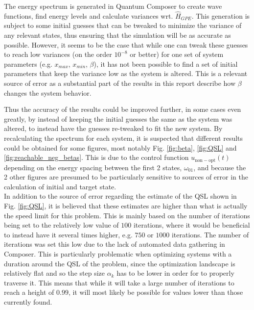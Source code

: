 \documentclass[a4paper, twocolumn]{revtex4-1}
\begin{document}
The energy spectrum is generated in Quantum Composer to create wave functions, find energy levels and calculate variances wrt. $\hat{H}_{GPE}$. This generation is subject to some initial guesses that can be tweaked to minimize the variance of any relevant states, thus ensuring that the simulation will be as accurate as possible. However, it seems to be the case that while one can tweak these guesses to reach low variances (on the order $10^{-8}$ or better) for one set of system parameters (e.g. $x_{max}$, $x_{min}$, $\beta$), it has not been possible to find a set of initial parameters that keep the variance low as the system is altered. This is a relevant source of error as a substantial part of the results in this report describe how $\beta$ changes the system behavior. 

Thus the accuracy of the results could be improved further, in some cases even greatly, by instead of keeping the initial guesses the same as the system was altered, to instead have the guesses re-tweaked to fit the new system. By recalculating the spectrum for each system, it is suspected that different results could be obtained for some figures, most notably Fig. \ref{fig:beta}, \ref{fig:QSL} and \ref{fig:reachable_neg_betas}. This is due to the control function $u_{\mathrm{non-opt}}(t)$ depending on the energy spacing between the first 2 states, $\omega_{01}$, and because the 2 other figures are presumed to be particularly sensitive to sources of error in the calculation of initial and target state.   \\

In addition to the source of error regarding the estimate of the QSL shown in Fig. \ref{fig:QSL}, it is believed that these estimates are higher than what is actually the speed limit for this problem. This is mainly based on the number of  iterations being set to the relatively low value of $100$ iterations, where it would be beneficial to instead have it several times higher, e.g. $750$ or $1000$ iterations. The number of iterations was set this low due to the lack of automated data gathering in Composer. This is particularly problematic when optimizing systems with a duration around the QSL of the problem, since the optimization landscape is relatively flat and so the step size $\alpha_k$ has to be lower in order for  to properly traverse it. This means that while it will take a large number of iterations to reach a height of $0.99$, it will most likely be possible for values lower than those currently found. 
\end{document}
